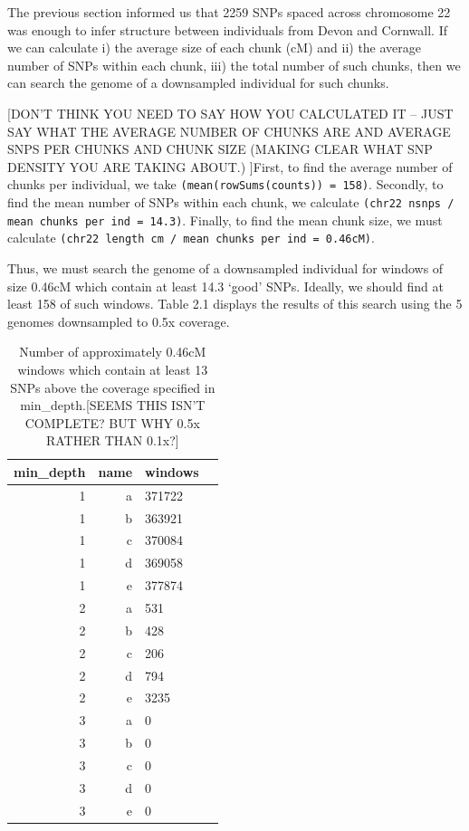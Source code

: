 The previous section informed us that 2259 SNPs spaced across chromosome 22 was enough to infer structure between individuals from Devon and Cornwall. If we can calculate i) the average size of each chunk (cM) and ii) the average number of SNPs within each chunk, iii) the total number of such chunks, then we can search the genome of a downsampled individual for such chunks.

{\color{red}[DON'T THINK YOU NEED TO SAY HOW YOU CALCULATED IT -- JUST SAY WHAT THE AVERAGE NUMBER OF CHUNKS ARE AND AVERAGE SNPS PER CHUNKS AND CHUNK SIZE (MAKING CLEAR WHAT SNP DENSITY YOU ARE TAKING ABOUT.) ]First, to find the average number of chunks per individual, we take \texttt{(mean(rowSums(counts)) = 158)}. Secondly, to find the mean number of SNPs within each chunk, we calculate \texttt{(chr22 nsnps / mean chunks per ind = 14.3)}. Finally, to find the mean chunk size, we must calculate \texttt{(chr22 length cm / mean chunks per ind = 0.46cM)}.}

Thus, we must search the genome of a downsampled individual for windows of size 0.46cM which contain at least 14.3 `good' SNPs. Ideally, we should find at least 158 of such windows. Table 2.1 displays the results of this search using the 5 genomes downsampled to 0.5x coverage.

\begin{table}[ht]
\centering
\begin{tabular}{rrlr}
  \hline
 min\_depth & name & windows \\ 
  \hline
    1 & a & 371722 \\ 
     1 & b & 363921 \\ 
     1 & c & 370084 \\ 
     1 & d & 369058 \\ 
     1 & e & 377874 \\ 
     2 & a & 531 \\ 
     2 & b & 428 \\ 
    2 & c & 206 \\ 
     2 & d & 794 \\ 
     2 & e & 3235 \\ 
     3 & a &   0 \\ 
     3 & b &   0 \\ 
     3 & c &   0 \\ 
     3 & d &   0 \\ 
     3 & e &   0 \\ 
   \hline
\end{tabular}
\caption{\label{tab:table-name}Number of approximately 0.46cM windows which contain at least 13 SNPs above the coverage specified in min\_depth.{\color{red}[SEEMS THIS ISN'T COMPLETE? BUT WHY 0.5x RATHER THAN 0.1x?]}}
\end{table}

